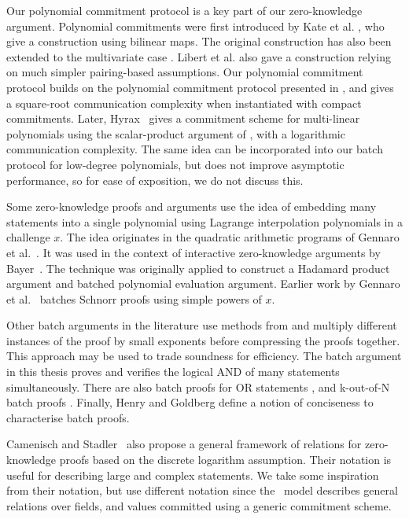 Our polynomial commitment protocol is a key part of our zero-knowledge argument. Polynomial commitments were first introduced by Kate et al. \cite{KateZG10}, who give a construction using bilinear maps. The original construction has also been extended to the multivariate case \cite{PapamanthouST13,ZhangGKPP17}. Libert et al. \cite{LibertRY16} also gave a construction relying on much simpler pairing-based assumptions. Our polynomial commitment protocol builds on the polynomial commitment protocol presented in \cite{BootleCCGP16}, and gives a square-root communication complexity when instantiated with compact commitments. Later, Hyrax~\cite{WahbyTSTW18} gives a commitment scheme for multi-linear polynomials using the scalar-product argument of \cite{BootleCCGP16,BunzBBPWM18}, with a logarithmic communication complexity. The same idea can be incorporated into our batch protocol for low-degree polynomials, but does not improve asymptotic performance, so for ease of exposition, we do not discuss this.

Some zero-knowledge proofs and arguments use the idea of embedding many statements into a single polynomial using Lagrange interpolation polynomials in a challenge $x$. The idea originates in the quadratic arithmetic programs of Gennaro et al.~\cite{Gennaro2013}. It was used in the context of interactive zero-knowledge arguments by Bayer~\cite{Bayer2014}. The technique was originally applied to construct a Hadamard product argument and batched polynomial evaluation argument. Earlier work by Gennaro et al.~\cite{Gennaro2004} batches Schnorr proofs using simple powers of $x$.

Other batch arguments in the literature use methods from \cite{Bellare1998} and multiply different instances of the proof by small exponents before compressing the proofs together. This approach may be used to trade soundness for efficiency. The batch argument in this thesis proves and verifies the logical AND of many statements simultaneously. There are also batch proofs for OR statements \cite{eng2009}, and k-out-of-N batch proofs \cite{Henry2013}. Finally, Henry and Goldberg \cite{Henry2013} define a notion of conciseness to characterise batch proofs.

Camenisch and Stadler~\cite{Camenisch1997} also propose a general framework of relations for zero-knowledge proofs based on the discrete logarithm assumption. Their notation is useful for describing large and complex statements. We take some inspiration from their notation, but use different notation since the \ILC\ model describes general relations over fields, and values committed using a generic commitment scheme.